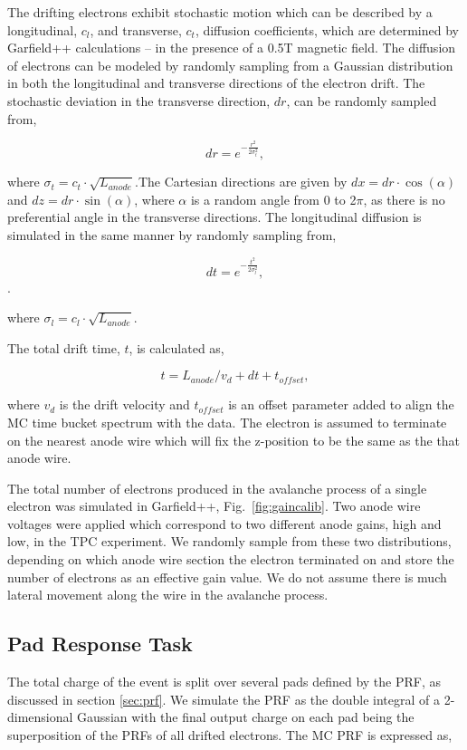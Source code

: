 The drifting electrons exhibit stochastic motion which can be described by a longitudinal, $c_{l}$, and transverse, $c_{t}$, diffusion coefficients, which are determined by Garfield++ calculations -- in the presence of a 0.5T magnetic field. The diffusion of electrons can be modeled by randomly sampling from a Gaussian distribution in both the longitudinal and transverse directions of the electron drift. The stochastic deviation in the transverse direction, $dr$, can be randomly sampled from,

\begin{equation}
dr = e^{-\frac{r^2}{2\sigma_{t}^2}},
\end{equation}

where $\sigma_{t}=c_{t}\cdot\sqrt{L_{anode}}$.The Cartesian directions are given by $dx = dr \cdot \cos(\alpha)$ and $dz = dr \cdot \sin(\alpha)$, where $\alpha$ is a random angle from 0 to 2$\pi$, as there is no preferential angle in the transverse directions. The longitudinal diffusion is simulated in the same manner by randomly sampling from, 

\begin{equation}
dt = e^{-\frac{t^2}{2\sigma_{l}^2}},
\end{equation}.

where $\sigma_{l}=c_{l}\cdot\sqrt{L_{anode}}$. 

The total drift time, $t$, is calculated as,

\begin{equation}
 t = L_{anode}/v_d + dt + t_{offset},
\end{equation}
 
 where $v_d$ is the drift velocity and $t_{offset}$ is an offset parameter added to align the MC time bucket spectrum with the data. The electron is assumed to terminate on the nearest anode wire which will fix the z-position to be the same as the that anode wire. 

The total number of electrons produced in the avalanche process of a single electron was simulated in Garfield++, Fig.~\ref{fig:gaincalib}. Two anode wire voltages were applied which correspond to two different anode gains, high and low, in the TPC experiment. We randomly sample from these two distributions, depending on which anode wire section the electron terminated on and store the number of electrons as an effective gain value. We do not assume there is much lateral movement along the wire in the avalanche process. 

\subsection{Pad Response Task}
The total charge of the event is split over several pads defined by the PRF, as discussed in section \ref{sec:prf}. We simulate the PRF as the double integral of a 2-dimensional Gaussian with the final output charge on each pad being the superposition of the PRFs of all drifted electrons. The MC PRF is expressed as, 

